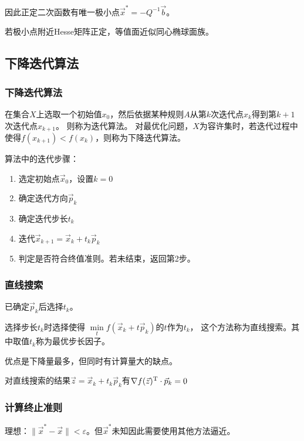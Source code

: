 因此正定二次函数有唯一极小点$\vec{x}^*=-Q^{-1}\vec{b}$。

若极小点附近Hesse矩阵正定，等值面近似同心椭球面族。

\subsection{下降迭代算法}
\subsubsection{下降迭代算法}

\begin{definition}
    在集合$X$上选取一个初始值$x_0$，然后依据某种规则$A$从第$k$次迭代点$x_k$得到第$k+1$次迭代点$x_{k+1}$。
    则称为迭代算法。
    对最优化问题，$X$为容许集时，若迭代过程中使得$f(x_{k+1})<f(x_k)$，则称为下降迭代算法。
\end{definition}

算法中的迭代步骤：
\begin{enumerate}
    \item 选定初始点$\vec{x}_0$，设置$k=0$
    \item 确定迭代方向$\vec{p}_k$
    \item 确定迭代步长$t_k$
    \item 迭代$\vec{x}_{k+1}=\vec{x}_k+t_k \vec{p}_k$
    \item 判定是否符合终值准则。若未结束，返回第2步。
\end{enumerate}

\subsubsection{直线搜索}
已确定$\vec{p}_k$后选择$t_k$。
\begin{definition}
    选择步长$t_k$时选择使得
    $\min\limits_t f(\vec{x}_k+t\vec{p}_k)$的$t$作为$t_k$，
    这个方法称为直线搜索。其中取值$t_k$称为最优步长因子。
\end{definition}

优点是下降量最多，但同时有计算量大的缺点。

\begin{property}
    对直线搜索的结果$\vec{z}=\vec{x}_k+t_k\vec{p}_k$有$\nabla f(\vec{z})^\mathrm{T} \cdot \vec{p}_k=0$
\end{property}

\subsubsection{计算终止准则}
理想：$\|\vec{x}^*-\vec{x}\|<\varepsilon$。但$\vec{x}^*$未知因此需要使用其他方法逼近。

